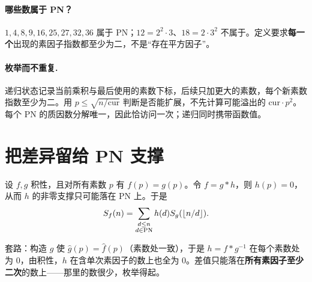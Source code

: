 \paragraph{哪些数属于 PN？}
$1,4,8,9,16,25,27,32,36$ 属于 PN；$12=2^2\cdot3$、$18=2\cdot3^2$ 不属于。定义要求\textbf{每一个}出现的素因子指数都至少为二，不是“存在平方因子”。
\paragraph{枚举而不重复.} 递归状态记录当前乘积与最后使用的素数下标，后续只加更大的素数，每个新素数指数至少为二。用 $p\le\sqrt{n/\text{cur}}$ 判断是否能扩展，不先计算可能溢出的 $\text{cur}\cdot p^2$。每个 PN 的质因数分解唯一，因此恰访问一次；递归同时携带函数值。


\section{把差异留给 PN 支撑}
\begin{theorem}[PN 求和转化]
设 $f,g$ 积性，且对所有素数 $p$ 有 $f(p)=g(p)$。令 $f=g*h$，则 $h(p)=0$，从而 $h$ 的非零支撑只可能落在 PN 上。于是
\[
 S_f(n)=\sum_{\substack{d\le n\\d\in\mathrm{PN}}}h(d)S_g(\left\lfloor n/d\right\rfloor).
\]
\end{theorem}

\begin{tip}
套路：构造 $g$ 使 $\hat g(p)=\hat f(p)$（素数处一致），于是 $h=f*g^{-1}$ 在每个素数处为 $0$，由积性，$h$ 在含单次素因子的数上也全为 $0$。差值只能落在\textbf{所有素因子至少二次}的数上——那里的数很少，枚举得起。
\end{tip}


